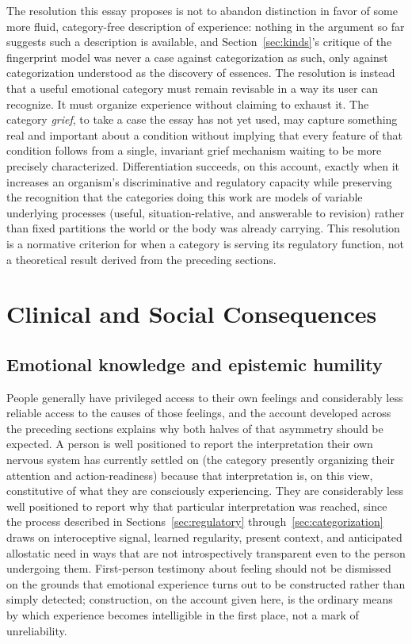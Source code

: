 \documentclass[11pt]{article}
\begin{document}
The resolution this essay proposes is not to abandon distinction in favor of some more fluid, category-free description of experience: nothing in the argument so far suggests such a description is available, and Section~\ref{sec:kinds}'s critique of the fingerprint model was never a case against categorization as such, only against categorization understood as the discovery of essences. The resolution is instead that a useful emotional category must remain revisable in a way its user can recognize. It must organize experience without claiming to exhaust it. The category \emph{grief}, to take a case the essay has not yet used, may capture something real and important about a condition without implying that every feature of that condition follows from a single, invariant grief mechanism waiting to be more precisely characterized. Differentiation succeeds, on this account, exactly when it increases an organism's discriminative and regulatory capacity while preserving the recognition that the categories doing this work are models of variable underlying processes (useful, situation-relative, and answerable to revision) rather than fixed partitions the world or the body was already carrying. This resolution is a normative criterion for when a category is serving its regulatory function, not a theoretical result derived from the preceding sections.

\section{Clinical and Social Consequences}\label{sec:clinical}

\subsection{Emotional knowledge and epistemic humility}

People generally have privileged access to their own feelings and considerably less reliable access to the causes of those feelings, and the account developed across the preceding sections explains why both halves of that asymmetry should be expected. A person is well positioned to report the interpretation their own nervous system has currently settled on (the category presently organizing their attention and action-readiness) because that interpretation is, on this view, constitutive of what they are consciously experiencing. They are considerably less well positioned to report why that particular interpretation was reached, since the process described in Sections~\ref{sec:regulatory} through~\ref{sec:categorization} draws on interoceptive signal, learned regularity, present context, and anticipated allostatic need in ways that are not introspectively transparent even to the person undergoing them. First-person testimony about feeling should not be dismissed on the grounds that emotional experience turns out to be constructed rather than simply detected; construction, on the account given here, is the ordinary means by which experience becomes intelligible in the first place, not a mark of unreliability.
\end{document}
